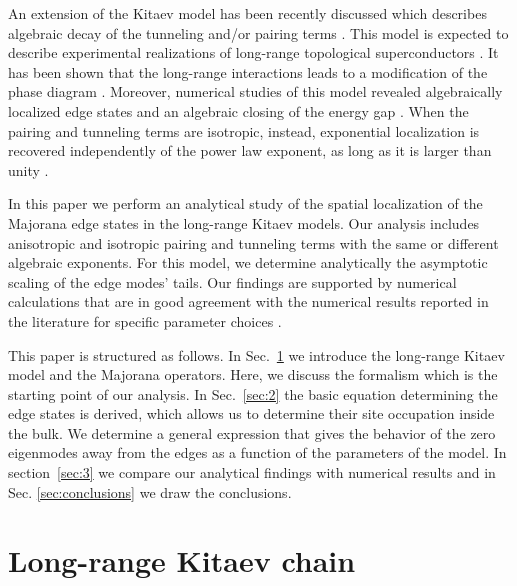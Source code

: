 \documentclass[pra,twocolumn,
superscriptaddress,
showpacs,
aps
]{revtex4-1}
\begin{document}
An extension of the Kitaev model has been recently discussed which describes algebraic decay of the tunneling and/or pairing terms 	\cite{Pientka2013,Klinovaja2013,Pientka2014,Neupert2016,Vodola2014,Vodola2016,Alecce2017}. This model is expected to describe experimental realizations of long-range topological superconductors \cite{Nadj-Perge2014,Pawlak2016,Ruby2017}. It has been shown that the long-range interactions leads to a modification of the phase diagram \cite{Vodola2014,Vodola2016,Alecce2017}. Moreover, numerical studies of this model revealed algebraically localized edge states and an algebraic closing of the energy gap \cite{Vodola2014,Vodola2016}. When the pairing and tunneling terms are isotropic, instead, 
exponential localization is recovered independently of the power law exponent, as long as it is larger than unity \cite{Vodola2016}. 

In this paper we perform an analytical study of the spatial localization of the Majorana edge states in the long-range Kitaev models. Our analysis includes anisotropic and isotropic pairing and tunneling terms with the same or different algebraic exponents. For this model, we determine analytically the asymptotic scaling of the edge modes' tails. Our findings are supported by numerical calculations that are in good agreement with the numerical results reported in the literature for specific parameter choices \cite{Vodola2014,Vodola2016,Alecce2017,Viyuela2015,Viyuela:2018fpv}.

This paper is structured as follows. In Sec.~\ref{sec:1} we introduce the long-range Kitaev model and the Majorana operators. Here, we discuss the formalism which is the starting point of our analysis. In Sec.~\ref{sec:2} the basic equation determining the edge states is derived, which allows us to determine their site occupation inside the bulk. We determine a general expression that gives the behavior of the zero eigenmodes away from the edges as a function of the parameters of the model. In section~\ref{sec:3} we compare our analytical findings with numerical results and in Sec. \ref{sec:conclusions} we draw the conclusions.

\section{Long-range Kitaev chain}
\label{sec:1}
\end{document}
